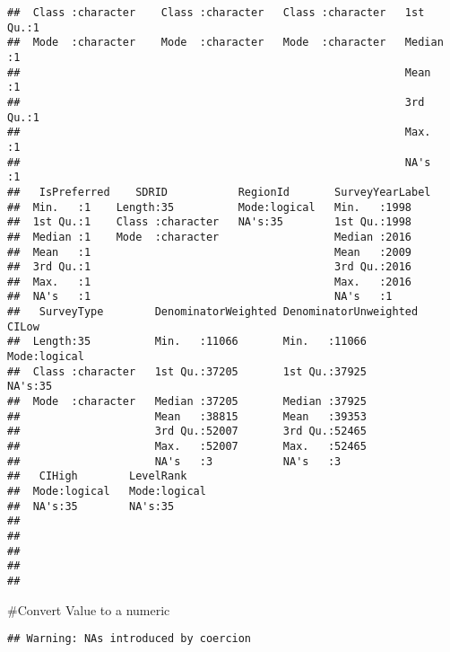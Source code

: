 \documentclass[
]{article}
\newenvironment{Shaded}{\begin{snugshade}}{\end{snugshade}}
\newcommand{\FunctionTok}[1]{\textcolor[rgb]{0.13,0.29,0.53}{\textbf{#1}}}
\newcommand{\NormalTok}[1]{#1}
\newcommand{\OtherTok}[1]{\textcolor[rgb]{0.56,0.35,0.01}{#1}}
\newcommand{\SpecialCharTok}[1]{\textcolor[rgb]{0.81,0.36,0.00}{\textbf{#1}}}
\begin{document}
\begin{verbatim}
##  Class :character    Class :character   Class :character   1st Qu.:1  
##  Mode  :character    Mode  :character   Mode  :character   Median :1  
##                                                            Mean   :1  
##                                                            3rd Qu.:1  
##                                                            Max.   :1  
##                                                            NA's   :1  
##   IsPreferred    SDRID           RegionId       SurveyYearLabel
##  Min.   :1    Length:35          Mode:logical   Min.   :1998   
##  1st Qu.:1    Class :character   NA's:35        1st Qu.:1998   
##  Median :1    Mode  :character                  Median :2016   
##  Mean   :1                                      Mean   :2009   
##  3rd Qu.:1                                      3rd Qu.:2016   
##  Max.   :1                                      Max.   :2016   
##  NA's   :1                                      NA's   :1      
##   SurveyType        DenominatorWeighted DenominatorUnweighted  CILow        
##  Length:35          Min.   :11066       Min.   :11066         Mode:logical  
##  Class :character   1st Qu.:37205       1st Qu.:37925         NA's:35       
##  Mode  :character   Median :37205       Median :37925                       
##                     Mean   :38815       Mean   :39353                       
##                     3rd Qu.:52007       3rd Qu.:52465                       
##                     Max.   :52007       Max.   :52465                       
##                     NA's   :3           NA's   :3                           
##   CIHigh        LevelRank     
##  Mode:logical   Mode:logical  
##  NA's:35        NA's:35       
##                               
##                               
##                               
##                               
## 
\end{verbatim}

\#Convert Value to a numeric

\begin{Shaded}
\end{Shaded}

\begin{verbatim}
## Warning: NAs introduced by coercion
\end{verbatim}
\end{document}
